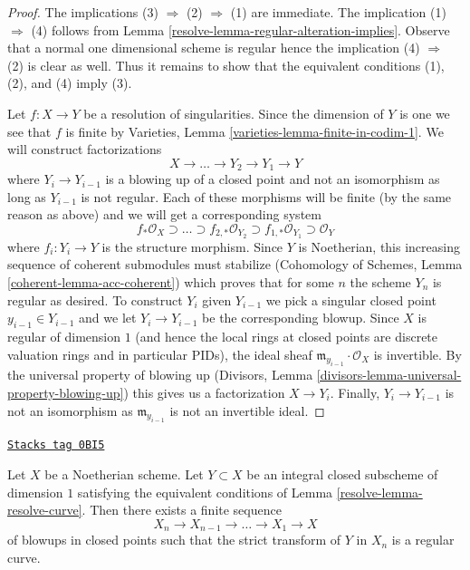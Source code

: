 \begin{proof}

The implications (3) $\Rightarrow$ (2) $\Rightarrow$ (1) are immediate.
The implication (1) $\Rightarrow$ (4) follows from
Lemma \ref{resolve-lemma-regular-alteration-implies}.
Observe that a normal one dimensional scheme is regular hence
the implication (4) $\Rightarrow$ (2) is clear as well.
Thus it remains to show that the equivalent conditions (1), (2), and
(4) imply (3).

\medskip\noindent
Let $f : X \to Y$ be a resolution of singularities. Since the dimension
of $Y$ is one we see that $f$ is finite by
Varieties, Lemma \ref{varieties-lemma-finite-in-codim-1}.
We will construct factorizations
$$
X \to \ldots \to Y_2 \to Y_1 \to Y
$$
where $Y_i \to Y_{i - 1}$ is a blowing up of a closed point and not
an isomorphism as long as $Y_{i - 1}$ is not regular.
Each of these morphisms will be finite (by the same
reason as above) and we will get a corresponding system
$$
f_*\mathcal{O}_X \supset \ldots \supset
f_{2, *}\mathcal{O}_{Y_2} \supset
f_{1, *}\mathcal{O}_{Y_1} \supset \mathcal{O}_Y
$$
where $f_i : Y_i \to Y$ is the structure morphism.
Since $Y$ is Noetherian, this increasing sequence of coherent submodules
must stabilize
(Cohomology of Schemes, Lemma \ref{coherent-lemma-acc-coherent})
which proves that for some $n$ the scheme $Y_n$ is regular
as desired. To construct $Y_i$ given $Y_{i - 1}$ we pick a singular
closed point $y_{i - 1} \in Y_{i - 1}$ and we let $Y_i \to Y_{i - 1}$
be the corresponding blowup. Since $X$ is regular of dimension $1$
(and hence the local rings at closed points are discrete valuation
rings and in particular PIDs), the ideal sheaf
$\mathfrak m_{y_{i - 1}} \cdot \mathcal{O}_X$ is invertible.
By the universal property of blowing up (Divisors, Lemma
\ref{divisors-lemma-universal-property-blowing-up})
this gives us a factorization
$X \to Y_i$.
Finally, $Y_i \to Y_{i - 1}$ is not an isomorphism as
$\mathfrak m_{y_{i - 1}}$ is not an invertible ideal.
\end{proof}

\begin{lemma}
\label{resolve-lemma-blowup-curve}
\href{https://stacks.math.columbia.edu/tag/0BI5}{\texttt{Stacks tag 0BI5}}

Let $X$ be a Noetherian scheme. Let $Y \subset X$ be an integral closed
subscheme of dimension $1$ satisfying the equivalent conditions of
Lemma \ref{resolve-lemma-resolve-curve}. Then there exists a finite sequence
$$
X_n \to X_{n - 1} \to \ldots \to X_1 \to X
$$
of blowups in closed points such that the strict transform of $Y$
in $X_n$ is a regular curve.
\end{lemma}

